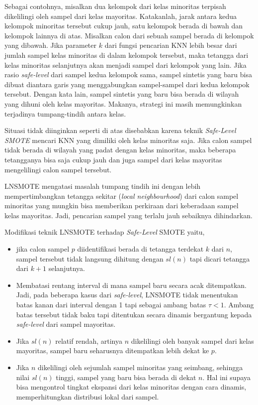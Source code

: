 \newpage
Sebagai contohnya, misalkan dua kelompok dari kelas minoritas terpisah
dikelilingi oleh sampel dari kelas mayoritas.
Katakanlah, jarak antara kedua kelompok minoritas tersebut cukup jauh, satu
kelompok berada di bawah dan kelompok lainnya di atas.
Misalkan calon dari sebuah sampel berada di kelompok yang dibawah.
Jika parameter $ k $ dari fungsi pencarian KNN lebih besar dari jumlah sampel
kelas minoritas di dalam kelompok tersebut, maka tetangga dari kelas minoritas
selanjutnya akan menjadi sampel dari kelompok yang lain.
Jika rasio \textit{safe-level} dari sampel kedua kelompok sama, sampel sintetis
yang baru bisa dibuat diantara garis yang menggabungkan sampel-sampel dari
kedua kelompok tersebut.
Dengan kata lain, sampel sintetis yang baru bisa berada di wilayah yang dihuni
oleh kelas mayoritas.
Makanya, strategi ini masih memungkinkan terjadinya tumpang-tindih antara
kelas.

Situasi tidak diinginkan seperti di atas disebabkan karena teknik
\textit{Safe-Level SMOTE} mencari KNN yang dimiliki oleh kelas minoritas saja.
Jika calon sampel tidak berada di wilayah yang padat dengan kelas minoritas,
maka beberapa tetangganya bisa saja cukup jauh dan juga sampel dari kelas
mayoritas mengelilingi calon sampel tersebut.

LNSMOTE mengatasi masalah tumpang tindih ini dengan lebih mempertimbangkan
tetangga sekitar
(\textit{local neighbourhood})
dari calon sampel minoritas yang mungkin bisa memberikan perkiraan dari
keberadaan sampel kelas mayoritas.
Jadi, pencarian sampel yang terlalu jauh sebaiknya dihindarkan.

Modifikasi teknik LNSMOTE terhadap \textit{Safe-Level} SMOTE yaitu,
\begin{itemize}
\item jika calon sampel $ p $ diidentifikasi berada di tetangga terdekat $ k
$ dari $ n $, sampel tersebut tidak langsung dihitung dengan $ sl(n) $ tapi
dicari tetangga dari $ k + 1 $ selanjutnya.
\item Membatasi rentang interval di mana sampel baru secara acak ditempatkan.
Jadi, pada beberapa kasus dari \textit{safe-level}, LNSMOTE tidak menentukan
batas kanan dari interval dengan 1 tapi sebagai ambang batas $\tau < 1$.
Ambang batas tersebut tidak baku tapi ditentukan secara dinamis bergantung
kepada \textit{safe-level} dari sampel mayoritas.
\item Jika $ sl(n) $ relatif rendah, artinya $ n $ dikelilingi oleh banyak
sampel dari kelas mayoritas, sampel baru seharusnya ditempatkan lebih dekat ke
$ p $.
\item Jika $ n $ dikelilingi oleh sejumlah sampel minoritas yang seimbang,
sehingga nilai $ sl(n) $ tinggi, sampel yang baru bisa berada di dekat $ n $.
Hal ini supaya bisa mengontrol tingkat ekspansi dari kelas minoritas dengan
cara dinamis, memperhitungkan distribusi lokal dari sampel.
\end{itemize}
